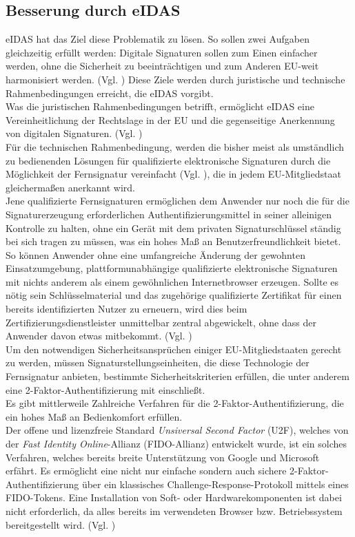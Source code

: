 \documentclass[deutsch]{lib/llncs/llncs}
\begin{document}
\subsection{Besserung durch eIDAS}
eIDAS hat das Ziel diese Problematik zu lösen. So sollen zwei Aufgaben gleichzeitig erfüllt werden: Digitale Signaturen sollen zum Einen einfacher werden, ohne die Sicherheit zu beeinträchtigen und zum Anderen EU-weit harmonisiert werden. (Vgl. \cite[S. 33]{Zitat08}) Diese Ziele werden durch juristische und technische Rahmenbedingungen erreicht, die eIDAS vorgibt. \\
Was die juristischen Rahmenbedingungen betrifft, ermöglicht eIDAS eine Vereinheitlichung der Rechtslage in der EU und die gegenseitige Anerkennung von digitalen Signaturen. (Vgl. \cite[S. 33]{Zitat08}) \\
Für die technischen Rahmenbedingung, werden die bisher meist als umständlich zu bedienenden Lösungen für qualifizierte elektronische Signaturen durch die Möglichkeit der Fernsignatur vereinfacht (Vgl. \cite[S. 30]{Zitat08}), die in jedem EU-Mitgliedstaat gleichermaßen anerkannt wird. \\
Jene qualifizierte Fernsignaturen ermöglichen dem Anwender nur noch die für die Signaturerzeugung erforderlichen Authentifizierungsmittel in seiner alleinigen Kontrolle zu halten, ohne ein Gerät mit dem privaten Signaturschlüssel ständig bei sich tragen zu müssen, was ein hohes Maß an Benutzerfreundlichkeit bietet. So können Anwender ohne eine umfangreiche Änderung der gewohnten Einsatzumgebung, plattformunabhängige qualifizierte elektronische Signaturen mit nichts anderem als einem gewöhnlichen Internetbrowser erzeugen.  Sollte es nötig sein Schlüsselmaterial und das zugehörige qualifizierte Zertifikat für einen bereits identifizierten Nutzer zu erneuern, wird dies beim Zertifizierungsdienstleister unmittelbar zentral abgewickelt, ohne dass der Anwender davon etwas mitbekommt. (Vgl. \cite[S. 233-234]{Zitat09})\\
Um den notwendigen Sicherheitsansprüchen einiger EU-Mitgliedstaaten gerecht zu werden, müssen Signaturstellungseinheiten, die diese Technologie der Fernsignatur anbieten, bestimmte Sicherheitskriterien erfüllen, die unter anderem eine 2-Faktor-Authentifizierung mit einschließt. \\
Es gibt mittlerweile Zahlreiche Verfahren für die 2-Faktor-Authentifizierung, die ein hohes Maß an Bedienkomfort erfüllen. \\
Der offene und lizenzfreie Standard \textit{Unsiversal Second Factor} (U2F), welches von der \textit{Fast Identity Online}-Allianz (FIDO-Allianz) entwickelt wurde, ist ein solches Verfahren, welches bereits breite Unterstützung von Google und Microsoft erfährt. Es ermöglicht eine nicht nur einfache sondern auch sichere 2-Faktor-Authentifizierung über ein klassisches Challenge-Response-Protokoll mittels eines FIDO-Tokens. Eine Installation von Soft- oder Hardwarekomponenten ist dabei nicht erforderlich, da alles bereits im verwendeten  Browser bzw. Betriebssystem bereitgestellt wird. (Vgl. \cite[S. 234]{Zitat09}) \\
\end{document}
